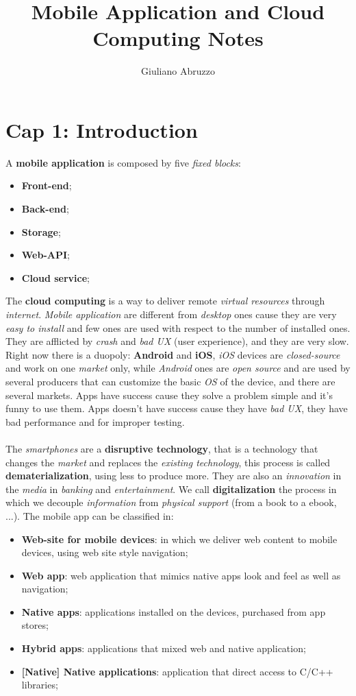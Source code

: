 \documentclass{article}
\author{Giuliano Abruzzo}
\title{Mobile Application and Cloud Computing Notes}
\begin{document}
\maketitle
\newpage
\tableofcontents
\newpage
\section{Cap 1: Introduction}
A \textbf{mobile application} is composed by five \emph{fixed blocks}:
\begin{itemize}
\item \textbf{Front-end};
\item \textbf{Back-end};
\item \textbf{Storage};
\item \textbf{Web-API};
\item \textbf{Cloud service};
\end{itemize}
The \textbf{cloud computing} is a way to deliver remote \emph{virtual resources} through \emph{internet}. \emph{Mobile application} are different from \emph{desktop} ones cause they are very \emph{easy to install} and few ones are used with respect to the number of installed ones. They are afflicted by \emph{crash} and \emph{bad UX }(user experience), and they are very slow. Right now there is a duopoly: \textbf{Android} and \textbf{iOS}, \emph{iOS} devices are \emph{closed-source} and work on one \emph{market} only, while \emph{Android} ones are \emph{open source} and are used by several producers that can customize the basic \emph{OS} of the device, and there are several markets. Apps have success cause they solve a problem simple and it's funny to use them. Apps doesn't have success cause they have \emph{bad UX}, they have bad performance and for improper testing. \\\\
The \emph{smartphones} are a \textbf{disruptive technology}, that is a technology that changes the \emph{market} and replaces the \emph{existing technology}, this process is called \textbf{dematerialization}, using less to produce more. They are also an \emph{innovation} in the \emph{media} in \emph{banking} and \emph{entertainment}. We call \textbf{digitalization} the process in which we decouple \emph{information} from \emph{physical support} (from a book to a ebook, ...). The mobile app can be classified in:
\begin{itemize}
\item \textbf{Web-site for mobile devices}: in which we deliver web content to mobile devices, using web site style navigation;
\item \textbf{Web app}: web application that mimics native apps look and feel as well as navigation;
\item \textbf{Native apps}: applications installed on the devices, purchased from app stores;
\item \textbf{Hybrid apps}: applications that mixed web and native application;
\item \textbf{[Native] Native applications}: application that direct access to C/C++ libraries;
\end{itemize}
\clearpage
\end{document}
